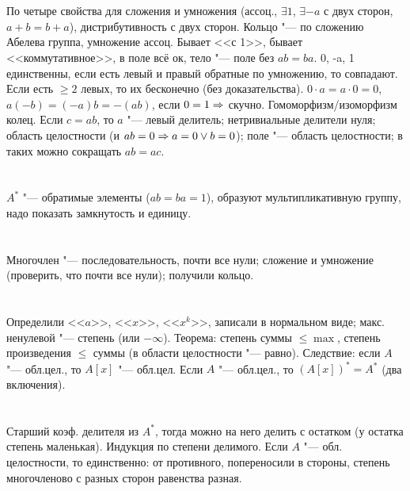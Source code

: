 \section{} %
По четыре свойства для сложения и умножения (ассоц., $\exists 1$, $\exists -a$ с двух сторон, $a+b=b+a$), дистрибутивность с двух сторон.
Кольцо "--- по сложению Абелева группа, умножение ассоц. Бывает <<с 1>>, бывает <<коммутативное>>, в поле всё ок, тело "--- поле без $ab=ba$.
0, -a, 1 единственны, если есть левый и правый обратные по умножению, то совпадают. Если есть $\ge 2$ левых, то их бесконечно (без доказательства).
$0\cdot a=a\cdot0=0$, $a(-b)=(-a)b=-(ab)$, если $0=1 \Rightarrow $ скучно. Гомоморфизм/изоморфизм колец. Если $c=ab$, то $a$ "--- левый делитель;
нетривиальные делители нуля; область целостности (и $ab=0 \Rightarrow a = 0 \lor b = 0$); поле "--- область целостности; в таких можно сокращать $ab=ac$.

\section{} %
$A^*$ "--- обратимые элементы ($ab=ba=1$), образуют мультипликативную группу, надо показать замкнутость и единицу.

\section{} %
Многочлен "--- последовательность, почти все нули; сложение и умножение (проверить, что почти все нули); получили кольцо.

\section{} %
Определили <<$a$>>, <<$x$>>, <<$x^k$>>, записали в нормальном виде; макс. ненулевой "--- степень (или $-\infty$). Теорема:
степень суммы $\le \max$, степень произведения $\le$ суммы (в области целостности "--- равно). Следствие: если $A$ "--- обл.цел.,
то $A[x]$ "--- обл.цел. Если $A$ "--- обл.цел., то $(A[x])^*=A^*$ (два включения).

\section{} %
Старший коэф. делителя из $A^*$, тогда можно на него делить с остатком (у остатка степень маленькая). Индукция по степени делимого. 
Если $A$ "--- обл. целостности, то единственно: от противного, попереносили в стороны, степень многочленово с разных сторон равенства разная.

